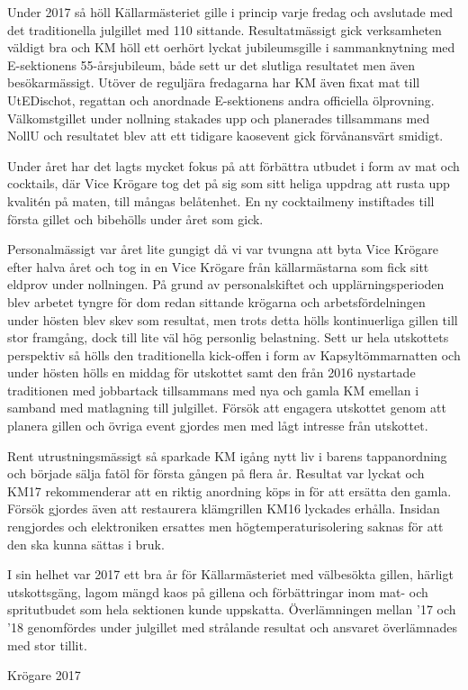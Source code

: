 \documentclass[../_main/handlingar.tex]{subfiles}
\begin{document}
Under 2017 så höll Källarmästeriet gille i princip varje fredag och avslutade med det traditionella julgillet med 110 sittande. Resultatmässigt gick verksamheten väldigt bra och KM höll ett oerhört lyckat jubileumsgille i sammanknytning med E-sektionens 55-årsjubileum, både sett ur det slutliga resultatet men även besökarmässigt. Utöver de reguljära fredagarna har KM även fixat mat till UtEDischot, regattan och anordnade E-sektionens andra officiella ölprovning. Välkomstgillet under nollning stakades upp och planerades tillsammans med NollU och resultatet blev att ett tidigare kaosevent gick förvånansvärt smidigt.

Under året har det lagts mycket fokus på att förbättra utbudet i form av mat och cocktails, där Vice Krögare tog det på sig som sitt heliga uppdrag att rusta upp kvalitén på maten, till mångas belåtenhet. En ny cocktailmeny instiftades till första gillet och bibehölls under året som gick.

Personalmässigt var året lite gungigt då vi var tvungna att byta Vice Krögare efter halva året och tog in en Vice Krögare från källarmästarna som fick sitt eldprov under nollningen. På grund av personalskiftet och upplärningsperioden blev arbetet tyngre för dom redan sittande krögarna och arbetsfördelningen under hösten blev skev som resultat, men trots detta hölls kontinuerliga gillen till stor framgång, dock till lite väl hög personlig belastning. Sett ur hela utskottets perspektiv så hölls den traditionella kick-offen i form av Kapsyltömmarnatten och under hösten hölls en middag för utskottet samt den från 2016 nystartade traditionen med jobbartack tillsammans med nya och gamla KM emellan i samband med matlagning till julgillet. Försök att engagera utskottet genom att planera gillen och övriga event gjordes men med lågt intresse från utskottet.

Rent utrustningsmässigt så sparkade KM igång nytt liv i barens tappanordning och började sälja fatöl för första gången på flera år. Resultat var lyckat och KM17 rekommenderar att en riktig anordning köps in för att ersätta den gamla. Försök gjordes även att restaurera klämgrillen KM16 lyckades erhålla. Insidan rengjordes och elektroniken ersattes men högtemperaturisolering saknas för att den ska kunna sättas i bruk.

I sin helhet var 2017 ett bra år för Källarmästeriet med välbesökta gillen, härligt utskottsgäng, lagom mängd kaos på gillena och förbättringar inom mat- och spritutbudet som hela sektionen kunde uppskatta. Överlämningen mellan ’17 och ’18 genomfördes under julgillet med strålande resultat och ansvaret överlämnades med stor tillit.

\begin{signatures}{1}
    \mvh
    \signature{Markus Rahne}{Krögare 2017}
\end{signatures}
\end{document}
